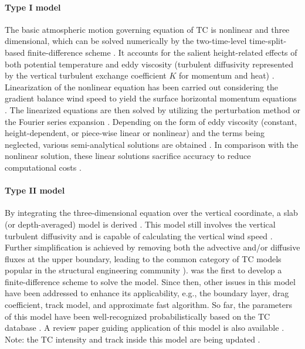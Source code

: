 \paragraph{Type I model} The basic atmospheric motion governing equation of TC is nonlinear and three dimensional, which can be solved numerically by the two-time-level time-split-based finite-difference scheme \citep{kepert2001dynamics-ii,kepert2011choosing}. It accounts for the salient height-related effects of both potential temperature and eddy viscosity (turbulent diffusivity represented by the vertical turbulent exchange coefficient $K$ for momentum and heat) \citep{kepert2001dynamics-ii, kepert2010slab-ii}. Linearization of the nonlinear equation has been carried out considering the gradient balance wind speed to yield the surface horizontal momentum equations \citep{kepert2001dynamics-i}. The linearized equations are then solved by utilizing the perturbation method \citep{meng1995analytical} or the Fourier series expansion \citep{kepert2001dynamics-i}. Depending on the form of eddy viscosity (constant, height-dependent, or piece-wise linear or nonlinear) and the terms being neglected, various semi-analytical solutions are obtained \citep{fang2018novel, huang2013prediction, kepert2006observed, meng1995analytical, meng1997numerical, snaiki2017linear}. In comparison with the nonlinear solution, these linear solutions sacrifice accuracy to reduce computational costs \citep{kepert2014reply}. 

\paragraph{Type II model} By integrating the three-dimensional equation over the vertical coordinate, a slab (or depth-averaged) model is derived \citep{kepert2010slab-i}. This model still involves the vertical turbulent diffusivity and is capable of calculating the vertical wind speed \citep{langousis2008extreme, smith1968surface, smith2008simple}. Further simplification is achieved by removing both the advective and/or diffusive fluxes at the upper boundary, leading to the common category of TC models popular in the structural engineering community \citep{powell2005state, shapiro1983asymmetric, vickery2000hurricane,  vickery2009hurricane-b}). \citet{chow1971study} was the first to develop a finite-difference scheme to solve the model. Since then, other issues in this model have been addressed to enhance its applicability, e.g., the boundary layer, drag coefficient, track model, and approximate fast algorithm. So far, the parameters of this model have been well-recognized probabilistically based on the TC database \citep{vickery2008statistical}. A review paper guiding application of this model is also available \citep{vickery2009hurricane-a}. Note: the TC intensity and track inside this model are being updated \citep{mudd2015development, vickery2010synthetic}. 

